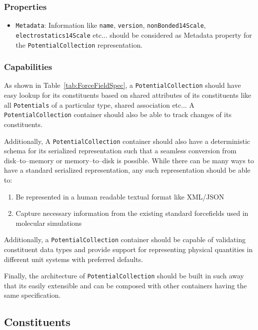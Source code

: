 \documentclass[12pt]{article}
\begin{document}
\subsubsection{Properties}
\begin{itemize}
    \item \texttt{Metadata}: Information like \texttt{name}, \texttt{version}, \texttt{nonBonded14Scale}, \texttt{electrostatics14Scale} etc...  should be considered as Metadata property for the \texttt{PotentialCollection} representation.
\end{itemize}

\subsubsection{Capabilities}
As shown in Table~\ref{tab:ForceFieldSpec}, a  \texttt{PotentialCollection} should have easy lookup for its constituents based on shared attributes of its constituents like all \texttt{Potentials} of a particular type, shared association etc... A \texttt{PotentialCollection} container should also be able to track changes of its constituents.

Additionally, A \texttt{PotentialCollection} container should also have a deterministic schema for  its  serialized  representation  such  that  a  seamless  conversion  from  disk–to–memory  or memory–to–disk is possible. While there can be many ways to have a standard serialized representation, any such representation should be able to:

\begin{enumerate}
    \item Be represented in a human readable textual format like XML/JSON
    \item Capture necessary information from the existing standard forcefields used in molecular simulations
\end{enumerate}

Additionally, a \texttt{PotentialCollection} container should be capable of validating constituent data types and provide support for representing physical quantities in different unit systems with preferred defaults.

Finally, the architecture of \texttt{PotentialCollection} should be built in such away that its easily extensible and can be composed with other containers having the same specification.

\subsection{Constituents}
\pagebreak
\end{document}
